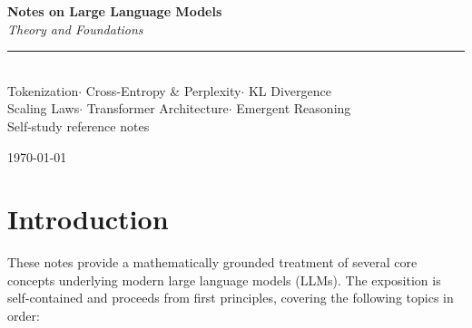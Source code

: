 \documentclass[11pt,a4paper]{article}
\theoremstyle{definition}
\theoremstyle{plain}
\begin{document}
\hypersetup{pageanchor=false}
\begin{titlepage}
  \pagecolor{primary}
  \color{white}
  \vspace*{4cm}
  \begin{center}
    {\Huge\bfseries Notes on Large Language Models}\\[0.6em]
    {\Large\itshape Theory and Foundations}\\[2.5em]
    \textcolor{accent!60!white}{\rule{0.5\linewidth}{1pt}}\\[1.8em]
    {\normalsize
      Tokenization\enspace$\cdot$\enspace
      Cross-Entropy \& Perplexity\enspace$\cdot$\enspace
      KL Divergence\\[0.4em]
      Scaling Laws\enspace$\cdot$\enspace
      Transformer Architecture\enspace$\cdot$\enspace
      Emergent Reasoning
    }\\[3em]
    {\small\color{gray!40} Self-study reference notes}
  \end{center}
  \vfill
  \begin{center}
    {\small\color{gray!40}\today}
  \end{center}
\end{titlepage}
\pagecolor{white}\color{black}

\tableofcontents
\newpage
\hypersetup{pageanchor=true}

\section{Introduction}

These notes provide a mathematically grounded treatment of several core concepts
underlying modern large language models (LLMs).
The exposition is self-contained and proceeds from first principles,
covering the following topics in order:
\end{document}

